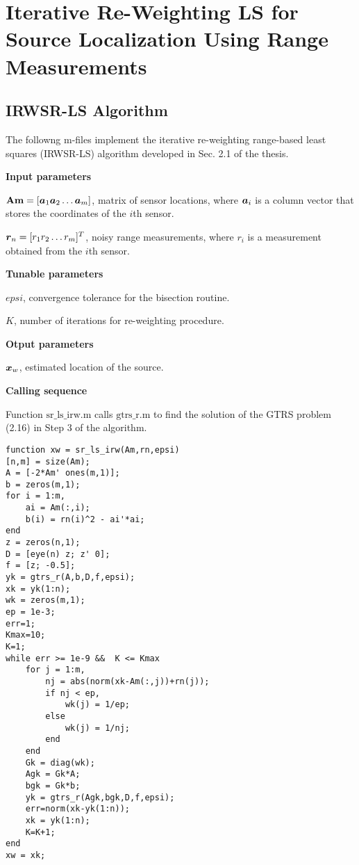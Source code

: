 \label{chapter:app2}


\section{Iterative Re-Weighting LS  for Source Localization Using Range Measurements}
\subsection{IRWSR-LS Algorithm}

The followng m-files implement the iterative re-weighting range-based least squares (IRWSR-LS) algorithm developed in Sec. 2.1 of the thesis. 

\noindent
\textbf{Input parameters}

\noindent
$\mbox{\textbf{Am}} = [\mbox{\boldmath$a$}_1 \mbox{\boldmath$a$}_2 \ldots \mbox{\boldmath$a$}_m]$, matrix of sensor locations, where $\mbox{\boldmath$a$}_i$ is a column vector that stores the coordinates of the $i$th sensor.

\noindent
$\mbox{\boldmath$r$}_n = [r_1 r_2 \ldots r_m]^T$, noisy range measurements, where $r_i$ is a measurement obtained from the $i$th sensor.

\noindent
\textbf{Tunable parameters}

\noindent
$epsi$, convergence tolerance for the bisection routine.

\noindent
$K$, number of iterations for re-weighting procedure.

\noindent
\textbf{Otput parameters}

\noindent
$\mbox{\boldmath$x$}_w$, estimated location of the source.

\noindent
\textbf{Calling sequence}

\noindent
Function $\mbox{sr\_ls\_irw.m}$ calls $\mbox{gtrs\_r.m}$ to find the solution of the GTRS problem (2.16) in Step 3 of the algorithm.

\begin{lstlisting}
function xw = sr_ls_irw(Am,rn,epsi)
[n,m] = size(Am);
A = [-2*Am' ones(m,1)];
b = zeros(m,1);
for i = 1:m,
    ai = Am(:,i);
    b(i) = rn(i)^2 - ai'*ai;
end
z = zeros(n,1);
D = [eye(n) z; z' 0];
f = [z; -0.5];
yk = gtrs_r(A,b,D,f,epsi);
xk = yk(1:n);
wk = zeros(m,1);
ep = 1e-3;
err=1;
Kmax=10; 
K=1;
while err >= 1e-9 &&  K <= Kmax 
    for j = 1:m,
        nj = abs(norm(xk-Am(:,j))+rn(j));
        if nj < ep,
            wk(j) = 1/ep;
        else
            wk(j) = 1/nj;
        end
    end
    Gk = diag(wk);
    Agk = Gk*A;
    bgk = Gk*b;
    yk = gtrs_r(Agk,bgk,D,f,epsi);
    err=norm(xk-yk(1:n));
    xk = yk(1:n);
    K=K+1;
end
xw = xk;
\end{lstlisting}

